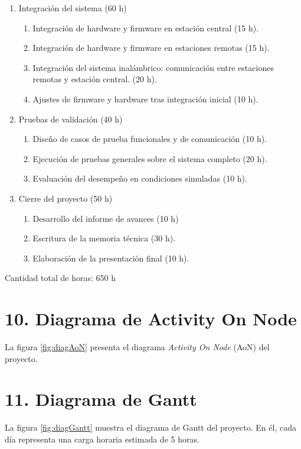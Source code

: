 \documentclass[
11pt, %
]{charter}
\begin{document}
\begin{enumerate}
	\item Integración del sistema (60 h)
	\begin{enumerate}
		\item Integración de hardware y firmware en estación central (15 h).
		\item Integración de hardware y firmware en estaciones remotas (15 h).
		\item Integración del sistema inalámbrico: comunicación entre estaciones remotas y estación central. (20 h).
		\item Ajustes de firmware y hardware tras integración inicial (10 h).
	\end{enumerate}
	
	\item Pruebas de validación (40 h)
	\begin{enumerate}
		\item Diseño de casos de prueba funcionales y de comunicación (10 h).
		\item Ejecución de pruebas generales sobre el sistema completo (20 h).
		\item Evaluación del desempeño en condiciones simuladas (10 h).
	\end{enumerate}
	
	\item Cierre del proyecto (50 h)
	\begin{enumerate}
		\item Desarrollo del informe de avances (10 h)
		\item Escritura de la memoria técnica (30 h).
		\item Elaboración de la presentación final (10 h).
	\end{enumerate}
\end{enumerate}

Cantidad total de horas: 650 h

\section{10. Diagrama de Activity On Node}
\label{sec:AoN}

La figura \ref{fig:diagAoN} presenta el diagrama \textit{Activity On Node} (AoN) del proyecto.

\section{11. Diagrama de Gantt}
\label{sec:gantt}

La figura \ref{fig:diagGantt} muestra el diagrama de Gantt del proyecto. En él, cada día representa una carga horaria estimada de 5 horas.
\end{document}
